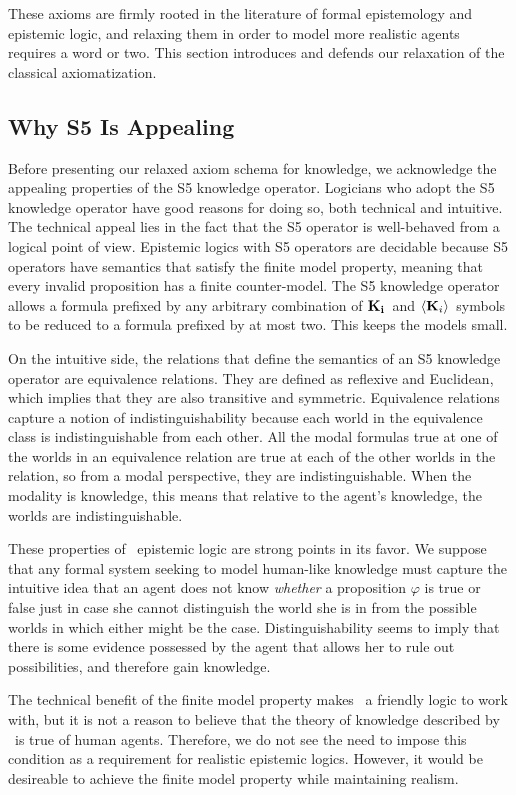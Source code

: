 These axioms are firmly rooted in the literature of formal epistemology and epistemic logic, and relaxing them in order to model more realistic agents requires a word or two. This section introduces and defends our relaxation of the classical axiomatization.

\subsection{Why S5 Is Appealing} 
Before presenting our relaxed axiom schema for knowledge, we acknowledge the appealing properties of the S5 knowledge operator. Logicians who adopt the S5 knowledge operator have good reasons for doing so, both technical and intuitive. The technical appeal lies in the fact that the S5 operator is well-behaved from a logical point of view. Epistemic logics with S5 operators are decidable because S5 operators have semantics that satisfy the finite model property, meaning that every invalid proposition has a finite counter-model. The S5 knowledge operator allows a formula prefixed by any arbitrary combination of $\mathbf{K}_{\mathbf{i}}\,$ and $\langle \mathbf{K}_{i} \rangle\,$ symbols to be reduced to a formula prefixed by at most two. This keeps the models small.

On the intuitive side, the relations that define the semantics of an S5 knowledge operator are equivalence relations. They are defined as reflexive and Euclidean, which implies that they are also transitive and symmetric. Equivalence relations capture a notion of indistinguishability because each world in the equivalence class is indistinguishable from each other. All the modal formulas true at one of the worlds in an equivalence relation are true at each of the other worlds in the relation, so from a modal perspective, they are indistinguishable. When the modality is knowledge, this means that relative to the agent's knowledge, the worlds are indistinguishable. 

These properties of \SFive\ epistemic logic are strong points in its favor. We suppose that any formal system seeking to model human-like knowledge must capture the intuitive idea that an agent does not know \emph{whether} a proposition $\varphi$ is true or false just in case she cannot distinguish the world she is in from the possible worlds in which either might be the case. Distinguishability seems to imply that there is some evidence possessed by the agent that allows her to rule out possibilities, and therefore gain knowledge.

The technical benefit of the finite model property makes \SFive\ a friendly logic to work with, but it is not a reason to believe that the theory of knowledge described by \SFive\ is true of human agents. Therefore, we do not see the need to impose this condition as a requirement for realistic epistemic logics. However, it would be desireable to achieve the finite model property while maintaining realism.

